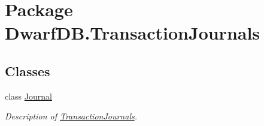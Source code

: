 \hypertarget{namespace_dwarf_d_b_1_1_transaction_journals}{\section{Package Dwarf\+D\+B.\+Transaction\+Journals}
\label{namespace_dwarf_d_b_1_1_transaction_journals}
}
\subsection*{Classes}
\begin{DoxyCompactItemize}
\item 
class \hyperlink{class_dwarf_d_b_1_1_transaction_journals_1_1_journal}{Journal}
\begin{DoxyCompactList}\small\item\em Description of \hyperlink{namespace_dwarf_d_b_1_1_transaction_journals}{Transaction\+Journals}. \end{DoxyCompactList}\end{DoxyCompactItemize}
